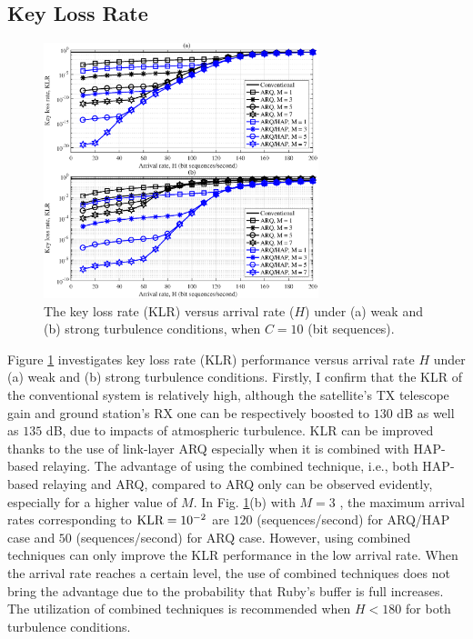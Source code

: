 \documentclass[conference]{IEEEtran}
\begin{document}
\subsection{Key Loss Rate}
\begin{figure}[t]
\begin{center}
\includegraphics[width=8cm]{Figures/Figure3.eps}
\end{center}
\caption{The key loss rate (KLR) versus arrival rate ($H$) under (a) weak and (b) strong turbulence conditions, when $C=10$ (bit sequences).}
\label{fig:KeyLossRate_ArrivalRate}
\end{figure} 

Figure \ref{fig:KeyLossRate_ArrivalRate} investigates key loss rate (KLR) performance versus arrival rate $H$ under (a) weak and (b) strong turbulence conditions. Firstly, I confirm that the KLR of the conventional system is relatively high, although the satellite's TX telescope gain and ground station's RX one can be respectively boosted to $130$ dB as well as $135$ dB, due to impacts of atmospheric turbulence. KLR can be improved thanks to the use of link-layer ARQ especially when it is combined with HAP-based relaying. The advantage of using the combined technique, i.e., both HAP-based relaying and ARQ, compared to ARQ only can be observed evidently, especially for a higher value of $M$. In Fig. \ref{fig:KeyLossRate_ArrivalRate}(b) with $M=3$ , the maximum arrival rates corresponding to $\textnormal{KLR}=10^{-2}$ are $120$ (sequences/second) for ARQ/HAP case and $50$ (sequences/second) for ARQ case. However, using combined techniques can only improve the KLR performance in the low arrival rate. When the arrival rate reaches a certain level, the use of combined techniques does not bring the advantage due to the probability that Ruby's buffer is full increases. The utilization of combined techniques is recommended when $H < 180$ for both turbulence conditions.
\end{document}
